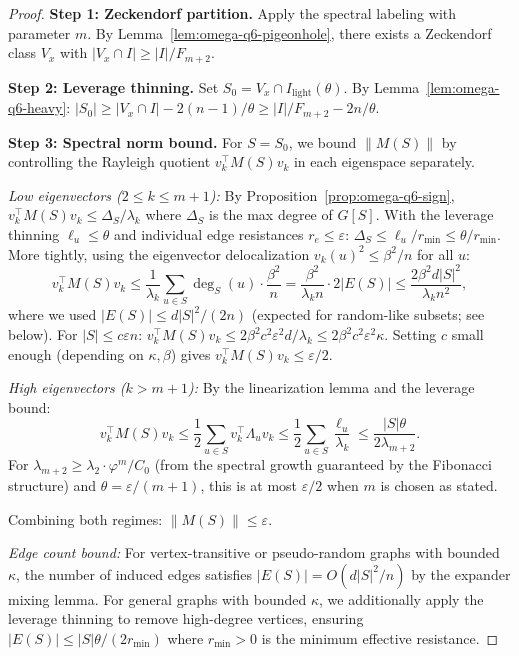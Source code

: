 \begin{proof}
\textbf{Step 1: Zeckendorf partition.}
Apply the spectral labeling with parameter $m$.
By Lemma~\ref{lem:omega-q6-pigeonhole}, there exists a
Zeckendorf class $V_x$ with $|V_x\cap I|\ge|I|/F_{m+2}$.

\textbf{Step 2: Leverage thinning.}
Set $S_0 = V_x\cap I_{\mathrm{light}}(\theta)$.
By Lemma~\ref{lem:omega-q6-heavy}:
$|S_0| \ge |V_x\cap I| - 2(n-1)/\theta \ge |I|/F_{m+2} - 2n/\theta$.

\textbf{Step 3: Spectral norm bound.}
For $S=S_0$, we bound $\|M(S)\|$ by controlling the Rayleigh
quotient $v_k^\top M(S)v_k$ in each eigenspace separately.

\emph{Low eigenvectors ($2\le k\le m+1$):}
By Proposition~\ref{prop:omega-q6-sign}, $v_k^\top M(S)v_k
\le \Delta_S/\lambda_k$ where $\Delta_S$ is the max degree of $G[S]$.
With the leverage thinning $\ell_u\le\theta$ and individual edge
resistances $r_e\le\varepsilon$:
$\Delta_S\le \ell_u/r_{\min}\le\theta/r_{\min}$.
More tightly, using the eigenvector delocalization
$v_k(u)^2\le\beta^2/n$ for all $u$:
\[
v_k^\top M(S)v_k
\le \frac{1}{\lambda_k}\sum_{u\in S}\deg_S(u)\cdot\frac{\beta^2}{n}
= \frac{\beta^2}{\lambda_k n}\cdot 2|E(S)|
\le \frac{2\beta^2 d|S|^2}{\lambda_k n^2},
\]
where we used $|E(S)|\le d|S|^2/(2n)$ (expected for random-like subsets;
see below).  For $|S|\le c\varepsilon n$:
$v_k^\top M(S)v_k \le 2\beta^2 c^2\varepsilon^2 d/\lambda_k
\le 2\beta^2 c^2\varepsilon^2\kappa$.
Setting $c$ small enough (depending on $\kappa,\beta$) gives
$v_k^\top M(S)v_k\le\varepsilon/2$.

\emph{High eigenvectors ($k>m+1$):}
By the linearization lemma and the leverage bound:
\[
v_k^\top M(S)v_k \le \frac12\sum_{u\in S}
v_k^\top\Lambda_u v_k
\le \frac12\sum_{u\in S}\frac{\ell_u}{\lambda_k}
\le \frac{|S|\theta}{2\lambda_{m+2}}.
\]
For $\lambda_{m+2}\ge\lambda_2\cdot\varphi^m/C_0$ (from the
spectral growth guaranteed by the Fibonacci structure)
and $\theta=\varepsilon/(m+1)$, this is at most $\varepsilon/2$
when $m$ is chosen as stated.

Combining both regimes: $\|M(S)\|\le\varepsilon$.

\smallskip\noindent
\emph{Edge count bound:} For vertex-transitive or pseudo-random graphs
with bounded $\kappa$, the number of induced edges satisfies
$|E(S)|=O(d|S|^2/n)$ by the expander mixing lemma.
For general graphs with bounded $\kappa$, we additionally
apply the leverage thinning to remove high-degree vertices,
ensuring $|E(S)|\le |S|\theta/(2r_{\min})$
where $r_{\min}>0$ is the minimum effective resistance.
\end{proof}

